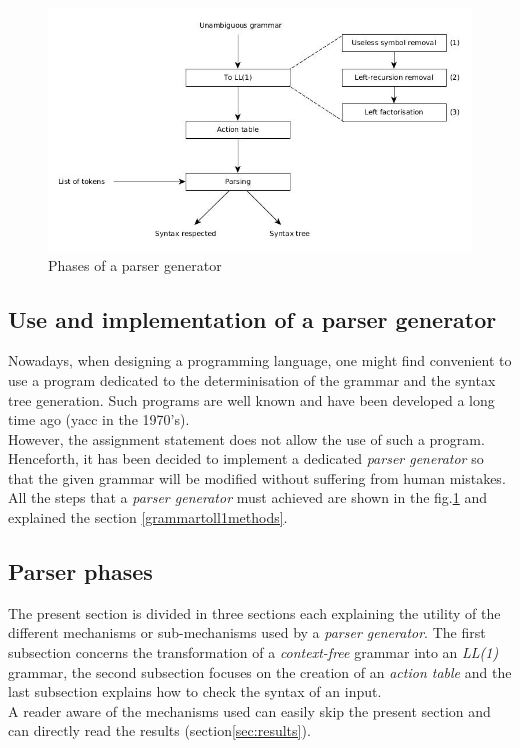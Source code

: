 \documentclass[a4paper,11pt]{article}
\begin{document}
  \begin{figure}[h!]
    \centering
    \includegraphics[scale=0.45]{./img/phase_of_parsing.jpg}
    \caption{Phases of a parser generator}
    \label{fig:parsergeneratorphases}
  \end{figure}
  
  \subsection{Use and implementation of a parser generator}
  Nowadays, when designing a programming language, one might find convenient to use a program dedicated to the determinisation of the grammar and the syntax tree generation. Such programs are well known and have been developed a long time ago (yacc in the 1970's).\\
  However, the assignment statement does not allow the use of such a program. Henceforth, it has been decided to implement a dedicated \textit{parser generator} so that the given grammar will be modified without suffering from human mistakes. All the steps that a \textit{parser generator} must achieved are shown in the fig.\ref{fig:parsergeneratorphases} and explained the section \ref{grammartoll1methods}.
  
  \subsection{Parser phases}
    The present section is divided in three sections each explaining the utility of the different mechanisms or sub-mechanisms used by a \textit{parser generator}. The first subsection concerns the transformation of a \textit{context-free} grammar into an \textit{LL(1)} grammar, the second subsection focuses on the creation of an \textit{action table} and the last subsection explains how to check the syntax of an input.\\
    A reader aware of the mechanisms used can easily skip the present section and can directly read the results (section\ref{sec:results}).
  
\end{document}
